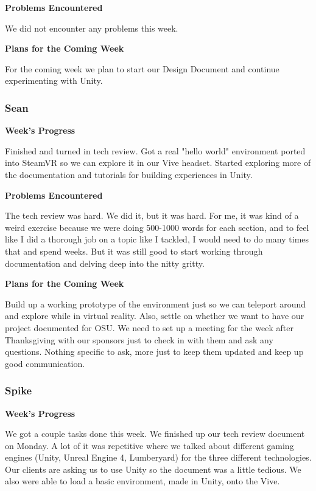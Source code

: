 \documentclass[10pt,journal,compsoc,onecolumn, draftclsnofoot]{IEEEtran}
\begin{document}
\noindent \textbf{Problems Encountered}

We did not encounter any problems this week.

\noindent \textbf{Plans for the Coming Week}

For the coming week we plan to start our Design Document and continue experimenting with Unity.

\subsubsection{Sean}
\noindent \textbf{Week's Progress}

Finished and turned in tech review.  Got a real "hello world" environment ported into SteamVR so we can explore it in our Vive headset.  Started exploring more of the documentation and tutorials for building experiences in Unity.

\noindent \textbf{Problems Encountered}

The tech review was hard.  We did it, but it was hard.  For me, it was kind of a weird exercise because we were doing 500-1000 words for each section, and to feel like I did a thorough job on a topic like I tackled, I would need to do many times that and spend weeks.  But it was still good to start working through documentation and delving deep into the nitty gritty.

\noindent \textbf{Plans for the Coming Week}

Build up a working prototype of the environment just so we can teleport around and explore while in virtual reality. Also, settle on whether we want to have our project documented for OSU.  We need to set up a meeting for the week after Thanksgiving with our sponsors just to check in with them and ask any questions.  Nothing specific to ask, more just to keep them updated and keep up good communication.

\subsubsection{Spike}
\noindent \textbf{Week's Progress}

We got a couple tasks done this week. We finished up our tech review document on Monday. A lot of it was repetitive where we talked about different gaming engines (Unity, Unreal Engine 4, Lumberyard) for the three different technologies. Our clients are asking us to use Unity so the document was a little tedious. We also were able to load a basic environment, made in Unity, onto the Vive.
\end{document}
